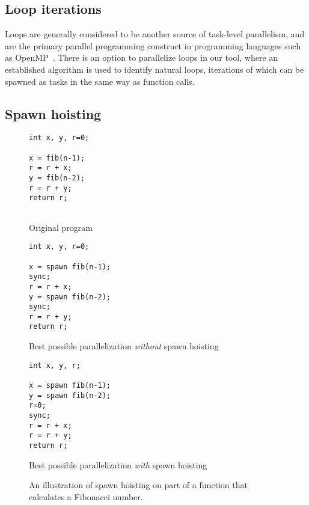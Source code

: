\subsection{Loop iterations}
Loops are generally considered to be another source of task-level parallelism, and are the primary parallel programming construct in programming languages such as OpenMP~\cite{dagum98openmp}.
There is an option to parallelize loops in our tool, where an established algorithm \cite{aho86compilers, muchnick97advanced} is used to identify natural loops, iterations of which can be spawned as tasks in the same way as function calls.

\subsection{Spawn hoisting}

\begin{figure}
  \begin{center}
  \scriptsize
  \begin{subfloat}
    \begin{minipage}{0.7in}
      \begin{verbatim}
int x, y, r=0;

x = fib(n-1);
r = r + x;
y = fib(n-2);
r = r + y;
return r;


      \end{verbatim}
    \end{minipage}%
    \label{orig}
    \caption{Original program}
  \end{subfloat}%
  \qquad
  \begin{subfloat}
    \begin{minipage}{1.0in}
      \begin{verbatim}
int x, y, r=0;

x = spawn fib(n-1);
sync;
r = r + x;
y = spawn fib(n-2);
sync;
r = r + y;
return r;
      \end{verbatim}
    \end{minipage}%
    \label{without}
    \caption{Best possible parallelization \emph{without} spawn hoisting}
  \end{subfloat}%
  \qquad
  \begin{subfloat}
    \begin{minipage}{1.0in}
      \begin{verbatim}
int x, y, r;

x = spawn fib(n-1);
y = spawn fib(n-2);
r=0;
sync;
r = r + x;
r = r + y;
return r;
      \end{verbatim}
    \end{minipage}%
    \label{with}
    \caption{Best possible parallelization \emph{with} spawn hoisting}
  \end{subfloat}%
  \end{center}
  \caption{An illustration of spawn hoisting on part of a function that calculates a Fibonacci number.}
  \label{spawn}
\end{figure}

